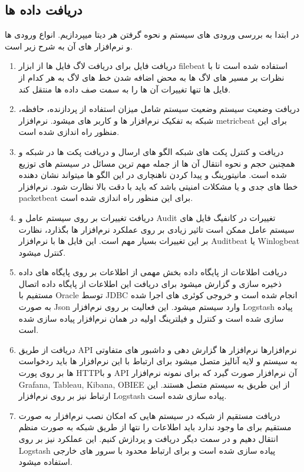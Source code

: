 \documentclass{llncs}
\begin{document}
\subsection{دریافت داده ها}
در ابتدا به بررسی ورودی های سیستم و نحوه گرفتن هر دیتا میپردازیم.
انواع ورودی ها و نرم‌افزار های آن به شرح زیر است.
\begin{enumerate}
    \item دریافت فایل
    \newline
    برای دریافت لاگ فایل ها از ابزار filebeat استفاده شده است تا با نظرات بر مسیر های لاگ ها به محض اضافه شدن خط های لاگ به هر کدام از فایل ها تنها تغییرات آن ها را به سمت صف داده ها منتقل کند.
    \item دریافت وضعیت سیستم
    \newline
    وضعیت سیستم شامل میزان استفاده از پردازنده، حافظه، شبکه به تفکیک نرم‌افزار ها و کاربر های میشود.
    نرم‌افزار metricbeat برای این منظور راه اندازی شده است.
    \item دریافت و کنترل پکت های شبکه
    \newline
    الگو های ارسال و دریافت پکت ها در شبکه و همچنین حجم و نحوه انتقال آن ها از جمله مهم ترین مسائل در سیستم های توزیع شده است. مانیتورینگ و پیدا کردن ناهنچاری در این الگو ها میتواند نشان دهنده خطا های جدی و یا مشکلات امنیتی باشد که باید با دقت بالا نظارت شود. نرم‌افزار packetbeat برای این منظور راه اندازی شده است.
    \item دریافت تغییرات بر روی سیستم عامل و Audit
    \newline
    تغییرات در کانفیگ فایل های سیستم عامل ممکن است تاثیر زیادی بر روی عملکرد نرم‌افزار ها بگذارد، نظارت بر این تغییرات بسیار مهم است.
    این فایل ها با نرم‌افزار Auditbeat یا Winlogbeat کنترل میشود.
    \item دریافت اطلاعات از پایگاه داده
    \newline
    بخش مهمی از اطلاعات بر روی پایگاه های داده ذخیره سازی و گزارش میشود برای دریافت این اطلاعات از پایگاه داده اتصال مستفیم با Oracle توسط JDBC انجام شده است و خروجی کوئری های اجرا شده به صورت Json وارد سیستم میشود.
    این فعالیت بر روی نرم‌افزار Logstash پیاده سازی شده است و کنترل و فیلترینگ اولیه در همان نرم‌افزار پیاده سازی شده است.
    
    \item دریافت از طریق API نرم‌افزارها
    \newline
    نرم‌افزار ها گزارش دهی و داشبور های متفاوتی به سیستم و لایه آنالیز متصل میشود برای ارتباط با این نرم‌افزار ها باید ردخواست ها بر روی پورت HTTPو با API آن نرم‌افزار صورت گیرد که برای نمونه نرم‌افزار Grafana, Tableau, Kibana, OBIEE از این طریق به سیستم متصل هستند.
    این ارتباط نیز بر روی نرم‌افزار Logstash پیاده سازی شده است.
    \item دریافت مستقیم از شبکه
    \newline
    در سیستم هایی که امکان نصب نرم‌افزار به صورت مستقیم برای ما وجود ندارد باید اطلاعات را نتها از طریق شبکه به صورت منظم انتقال دهیم و در سمت دیگر دریافت و پردازش کنیم.
    این عملکرد نیز بر روی Logstash پیاده سازی شده است و برای ارتباط محدود با سرور های خارجی استفاده میشود.
\end{enumerate}
\end{document}
